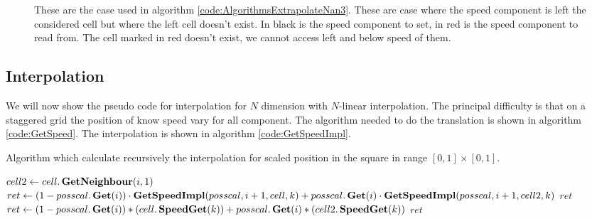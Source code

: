 \begin{figure}
\begin{center}
{
}
\end{center}
\caption{These are the case used in algorithm \ref{code:AlgorithmsExtrapolateNan3}. These are case where the speed component
is left the considered cell but where the left cell doesn't exist. In black is the speed component to set, in red is the speed component to read from. The cell marked in red doesn't exist, we cannot access left and below speed of them.}
\end{figure}
\subsection{Interpolation}

We will now show the pseudo code for interpolation for $N$ dimension with $N$-linear interpolation.
The principal difficulty is that on a staggered grid the position of know speed vary for all component.
The algorithm needed to do the translation is shown in algorithm \ref{code:GetSpeed}.
The interpolation is shown in algorithm \ref{code:GetSpeedImpl}.

\begin{algorithm}
\caption{Algorithm which calculate recursively the interpolation for scaled position in the square in range $[0,1]\times[0,1]$.}
\label{code:GetSpeedImpl}
\begin{algorithmic}[1]
\State $cell2 \gets cell.\mathop{\textbf{GetNeighbour}}(i,1)$
			\State $ret \gets (1-posscal.\mathop{\textbf{Get}}(i))\cdot \mathop{\textbf{GetSpeedImpl}}(posscal,i+1,cell,k)+posscal.\mathop{\textbf{Get}}(i)\cdot \mathop{\textbf{GetSpeedImpl}}(posscal,i+1,cell2,k)$
			\State \Return $ret$
		\Else {}
			\State $ret\gets (1-posscal.\mathop{\textbf{Get}}(i))*(cell.\mathop{\textbf{SpeedGet}}(k))+posscal.\mathop{\textbf{Get}}(i)*(cell2.\mathop{\textbf{SpeedGet}}(k))$
			\State \Return $ret$
		\EndIf
\EndFunction
\end{algorithmic}
\end{algorithm}

